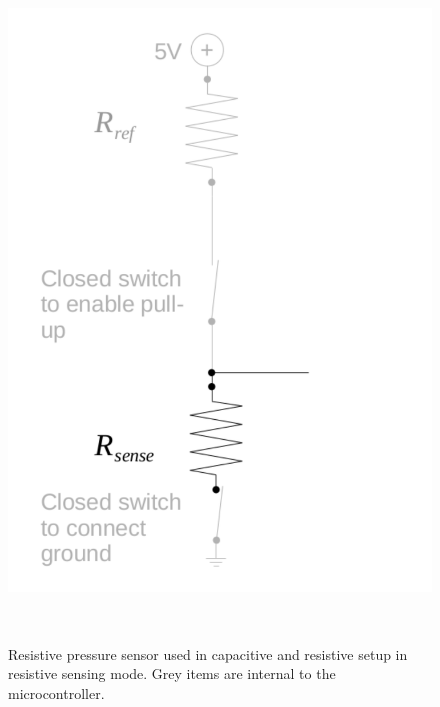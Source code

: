\documentclass{sigchi}
\begin{document}
\begin{figure}[!htbp]
\centering
  \includegraphics[width=0.9\columnwidth]{figures/cap_res_setup_res}
  \caption{Resistive pressure sensor used in capacitive and resistive setup in
resistive sensing mode. Grey items are internal to the
microcontroller.}~\label{fig:cap_res_setup_res}
\end{figure}
\end{document}
